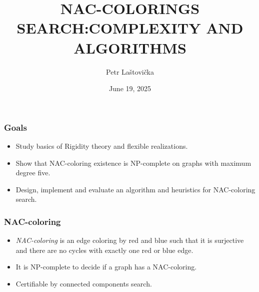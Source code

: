 \documentclass[aspectratio=\myaspectratio]{beamer}
\title{NAC-COLORINGS SEARCH\@:\newline COMPLEXITY AND ALGORITHMS}
\author{Petr Laštovička}
\institute{Czech Technical University, Faculty of Information Technology}
\date{June 19, 2025}
\begin{document}
\maketitle

\begin{frame}
	\frametitle{Goals}
	\begin{itemize}
		\item
		      Study basics of Rigidity theory and flexible realizations.
		\item
		      Show that NAC-coloring existence is NP-complete on graphs with maximum degree five.
		\item
		      Design, implement and evaluate an algorithm and heuristics for NAC-coloring search.
	\end{itemize}
\end{frame}

\begin{frame}
	\frametitle{NAC-coloring}
	\begin{itemize}
		\item
		      \emph{NAC-coloring} is an edge coloring by red and blue such that it is surjective and there are no cycles with exactly one red or blue edge.
		\item
		      It is NP-complete to decide if a graph has a NAC-coloring.
		\item
		      Certifiable by connected components search.
	\end{itemize}
\end{frame}
\end{document}
